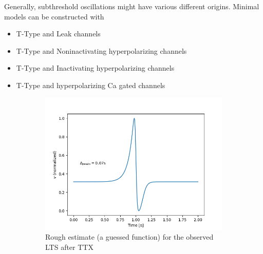 \documentclass[11pt]{article}
\begin{document}
Generally, subthreshold oscillations might have various different origins. Minimal models can be
constructed with
\begin{itemize}
    \item T-Type and Leak channels
    \item T-Type and Noninactivating hyperpolarizing channels
    \item T-Type and Inactivating hyperpolarizing channels
    \item T-Type and hyperpolarizing Ca gated channels
\end{itemize}

\begin{itemize}

    
    

    \begin{figure}[H]
        \centering
        \begin{subfigure}[t]{0.48\textwidth}
            \centering
            \includegraphics[width=\textwidth]{./img/2025_01_23/ttx_rough_estimate.png}
            \caption{Rough estimate (a guessed function) for the observed LTS after TTX}
            \label{fig_lts_rough_estimate}
        \end{subfigure}
        \hfill
        \begin{subfigure}[t]{0.48\textwidth}
            \centering

\end{subfigure}
\end{figure}
\end{itemize}
\end{document}
